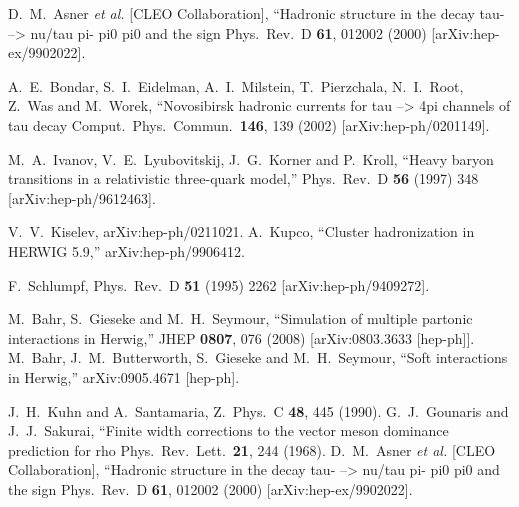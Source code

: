 \documentclass{article}
\begin{document}
\begin{thebibliography}{99}
  D.~M.~Asner {\it et al.}  [CLEO Collaboration],
   ``Hadronic structure in the decay tau- --> nu/tau pi- pi0 pi0 and the  sign
  Phys.\ Rev.\  D {\bf 61}, 012002 (2000)
  [arXiv:hep-ex/9902022].

  A.~E.~Bondar, S.~I.~Eidelman, A.~I.~Milstein, T.~Pierzchala, N.~I.~Root, Z.~Was and M.~Worek,
   ``Novosibirsk hadronic currents for tau --> 4pi channels of tau decay
  Comput.\ Phys.\ Commun.\  {\bf 146}, 139 (2002)
  [arXiv:hep-ph/0201149].

  M.~A.~Ivanov, V.~E.~Lyubovitskij, J.~G.~Korner and P.~Kroll,
  ``Heavy baryon transitions in a relativistic three-quark model,''
  Phys.\ Rev.\  D {\bf 56} (1997) 348
  [arXiv:hep-ph/9612463].

 V.~V.~Kiselev, arXiv:hep-ph/0211021.
  A.~Kupco,
  ``Cluster hadronization in HERWIG 5.9,''
  arXiv:hep-ph/9906412.

F.~Schlumpf,
Phys.\ Rev.\  D {\bf 51} (1995) 2262 [arXiv:hep-ph/9409272].

  M.~Bahr, S.~Gieseke and M.~H.~Seymour,
  ``Simulation of multiple partonic interactions in Herwig,''
  JHEP {\bf 0807}, 076 (2008)
  [arXiv:0803.3633 [hep-ph]].
  M.~Bahr, J.~M.~Butterworth, S.~Gieseke and M.~H.~Seymour,
  ``Soft interactions in Herwig,''
  arXiv:0905.4671 [hep-ph].

  J.~H.~Kuhn and A.~Santamaria,
  Z.\ Phys.\  C {\bf 48}, 445 (1990).
  G.~J.~Gounaris and J.~J.~Sakurai,
   ``Finite width corrections to the vector meson dominance prediction for rho
  Phys.\ Rev.\ Lett.\  {\bf 21}, 244 (1968).
  D.~M.~Asner {\it et al.}  [CLEO Collaboration],
   ``Hadronic structure in the decay tau- --> nu/tau pi- pi0 pi0 and the  sign
  Phys.\ Rev.\  D {\bf 61}, 012002 (2000)
  [arXiv:hep-ex/9902022].


\end{thebibliography}
\end{document}
